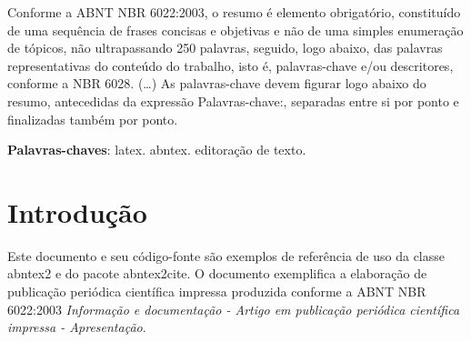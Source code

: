 \documentclass[
	article,			%
	11pt,				%
	oneside,			%
	a4paper,			%
	english,			%
	brazil,				%
	sumario=tradicional
	]{abntex2}
\begin{document}
\frenchspacing 


%
%
\maketitle

\begin{resumoumacoluna}
 Conforme a ABNT NBR 6022:2003, o resumo é elemento obrigatório, constituído de
 uma sequência de frases concisas e objetivas e não de uma simples enumeração
 de tópicos, não ultrapassando 250 palavras, seguido, logo abaixo, das palavras
 representativas do conteúdo do trabalho, isto é, palavras-chave e/ou
 descritores, conforme a NBR 6028. (\ldots) As palavras-chave devem figurar logo
 abaixo do resumo, antecedidas da expressão Palavras-chave:, separadas entre si por
 ponto e finalizadas também por ponto.
 
 \vspace{\onelineskip}
 
 \noindent
 \textbf{Palavras-chaves}: latex. abntex. editoração de texto.
\end{resumoumacoluna}


\textual

\newpage
\section*{Introdução}

Este documento e seu código-fonte são exemplos de referência de uso da classe
\textsf{abntex2} e do pacote \textsf{abntex2cite}. O documento exemplifica a 
elaboração de publicação periódica científica impressa produzida conforme a ABNT
NBR 6022:2003 \emph{Informação e documentação - Artigo em publicação periódica
científica impressa - Apresentação}.
\end{document}
